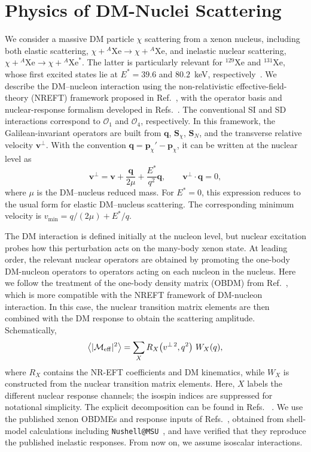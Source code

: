 \documentclass[11pt,a4paper]{article}
\newcommand{\Xe}{\mathrm{Xe}}
\begin{document}
\section{Physics of DM-Nuclei Scattering}
\label{sec:signal_model}
We consider a massive DM particle $\chi$ scattering from a xenon nucleus, including both elastic scattering, $\chi+{}^{A}\Xe\rightarrow\chi+{}^{A}\Xe$, and inelastic nuclear scattering, $\chi+{}^{A}\Xe\rightarrow\chi+{}^{A}\Xe^{*}$. The latter is particularly relevant for $^{129}\Xe$ and $^{131}\Xe$, whose first excited states lie at $E^{*}=39.6$ and $80.2$~keV, respectively~\cite{Baudis:2013bba,Arcadi:2019hrw}. We describe the DM--nucleon interaction using the non-relativistic effective-field-theory (NREFT) framework proposed in Ref.~\cite{Fan:2010gt}, with the operator basis and nuclear-response formalism developed in Refs.~\cite{Fitzpatrick:2012ix,Anand:2013yka}. The conventional SI and SD interactions correspond to $\mathcal O_1$ and $\mathcal O_4$, respectively. In this framework, the Galilean-invariant operators are built from $\bm q$, $\bm S_\chi$, $\bm S_N$, and the transverse relative velocity $\bm v^\perp$. With the convention $\bm q=\bm p_\chi'-\bm p_\chi$, it can be written at the nuclear level as
\begin{equation}
\bm v^\perp=\bm v+\frac{\bm q}{2\mu}+\frac{E^{*}}{q^2}\bm q,
\qquad
\bm v^\perp\cdot\bm q=0,
\label{eq:vperp_definition}
\end{equation}
where $\mu$ is the DM--nucleus reduced mass. For $E^{*}=0$, this expression reduces to the usual form for elastic DM--nucleus scattering. The corresponding minimum velocity is $v_{\min}=q/(2\mu)+E^{*}/q$.


The DM interaction is defined initially at the nucleon level, but nuclear excitation probes how this perturbation acts on the many-body xenon state. At leading order, the relevant nuclear operators are obtained by promoting the one-body DM-nucleon operators to operators acting on each nucleon in the nucleus. 
Here we follow the treatment of the one-body density matrix (OBDM) from Ref.~\cite{Arcadi:2019hrw}, which is more compatible with the NREFT framework of DM-nucleon interaction. In this case, the nuclear transition matrix elements are then combined with the DM response to obtain the scattering amplitude. Schematically,
\begin{equation} 
\left\langle |\mathcal M_{\rm eff}|^2\right\rangle = \sum_X R_X\!\left(v^{\perp\,2},q^2\right)\, W_X(q), \label{eq:general_inelastic_response} 
\end{equation} 
where $R_X$ contains the NR-EFT coefficients and DM kinematics, while $W_X$ is constructed from the nuclear transition matrix elements. Here, $X$ labels the different nuclear response channels; the isospin indices are suppressed for notational simplicity. The explicit decomposition can be found in Refs.~\cite{Anand:2013yka,Arcadi:2019hrw} . We use the published xenon OBDMEs and response inputs of Refs.~\cite{Arcadi:2019hrw}, obtained from shell-model calculations including \texttt{Nushell@MSU}~\cite{Brown:2014bhl}, and have verified that they reproduce the published inelastic responses. From now on, we assume isoscalar interactions.
\end{document}
